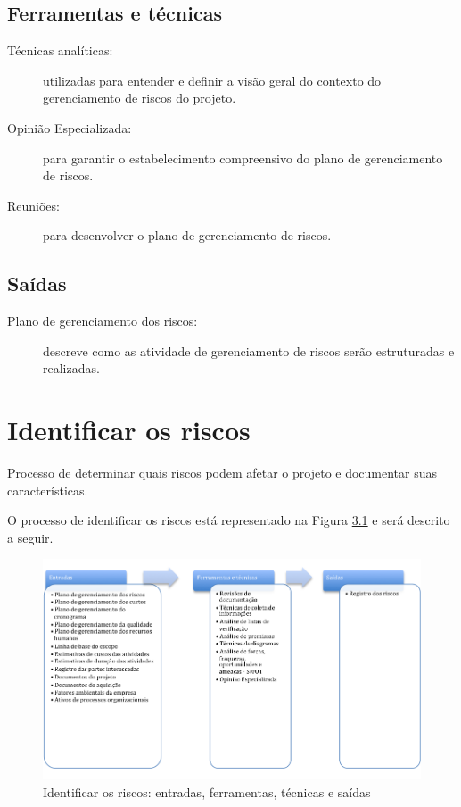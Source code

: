 \section{Ferramentas e técnicas}

\begin{description}

	\item[Técnicas analíticas:] utilizadas para entender e definir a visão geral do contexto do gerenciamento de riscos do projeto.
	
	\item[Opinião Especializada:] para garantir o estabelecimento compreensivo do plano de gerenciamento de riscos.
	
	\item[Reuniões:] para desenvolver o plano de gerenciamento de riscos.
	
\end{description}

\section{Saídas}

\begin{description}
	
	\item[Plano de gerenciamento dos riscos:] descreve como as atividade de gerenciamento de riscos serão estruturadas e realizadas.
	
\end{description}

\chapter{Identificar os riscos}

Processo de determinar quais riscos podem afetar o projeto e documentar suas características.

O processo de identificar os riscos está representado na Figura \ref{fig:riscos:ident:efts} e será descrito a seguir.

\begin{figure}[!h]
	\centering
	\includegraphics[scale=0.5]{Figuras/riscos_efts_identificar.png}
	\caption{Identificar os riscos: entradas, ferramentas, técnicas e saídas}
	\label{fig:riscos:ident:efts}
\end{figure}

